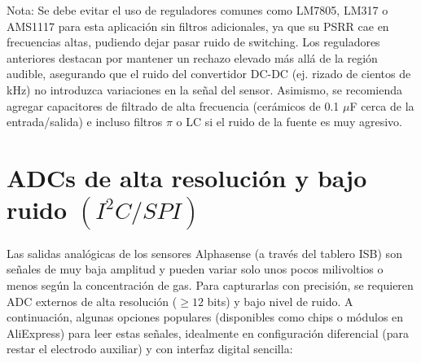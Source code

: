 \documentclass[a4paper, 12pt]{article}
\begin{document}
Nota: Se debe evitar el uso de reguladores comunes como LM7805, LM317 o AMS1117 para esta aplicación sin filtros adicionales, ya que su PSRR cae en frecuencias altas, pudiendo dejar pasar ruido de switching. Los reguladores anteriores destacan por mantener un rechazo elevado más allá de la región audible, asegurando que el ruido del convertidor DC-DC (ej. rizado de cientos de kHz) no introduzca variaciones en la señal del sensor. Asimismo, se recomienda agregar capacitores de filtrado de alta frecuencia (cerámicos de 0.1 $\mu$F cerca de la entrada/salida) e incluso filtros $\pi$ o LC si el ruido de la fuente es muy agresivo.

\section*{ADCs de alta resolución y bajo ruido $(I^2C/SPI)$}

Las salidas analógicas de los sensores Alphasense (a través del tablero ISB) son señales de muy baja amplitud y pueden variar solo unos pocos milivoltios o menos según la concentración de gas. Para capturarlas con precisión, se requieren ADC externos de alta resolución ($\ge 12$ bits) y bajo nivel de ruido. A continuación, algunas opciones populares (disponibles como chips o módulos en AliExpress) para leer estas señales, idealmente en configuración diferencial (para restar el electrodo auxiliar) y con interfaz digital sencilla:
\end{document}

